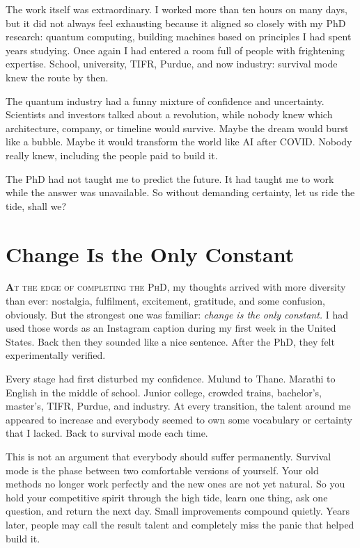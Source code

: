 \documentclass[11pt,twoside,openany]{book}
\newcommand{\dropcap}[2]{\lettrine[lines=3,findent=2pt,nindent=4pt]{\color{accent}\textsf{\textbf{#1}}}{#2}}
\newcommand{\scene}{\par\vspace{0.7em}{\centering\color{accent}\rule{0.85cm}{0.6pt}\par}\vspace{0.5em}\noindent\ignorespaces}
\begin{document}
\scene

The work itself was extraordinary. I worked more than ten hours on many days,
but it did not always feel exhausting because it aligned so closely with my
PhD research: quantum computing, building machines based on principles I had
spent years studying. Once again I had entered a room full of people with
frightening expertise. School, university, TIFR, Purdue, and now industry:
survival mode knew the route by then.

The quantum industry had a funny mixture of confidence and uncertainty.
Scientists and investors talked about a revolution, while nobody knew which
architecture, company, or timeline would survive. Maybe the dream would burst
like a bubble. Maybe it would transform the world like AI after COVID. Nobody
really knew, including the people paid to build it.

The PhD had not taught me to predict the future. It had taught me to work
while the answer was unavailable. So without demanding certainty, let us ride
the tide, shall we?

\chapter{Change Is the Only Constant}

\dropcap{A}{t the edge of completing the PhD,} my thoughts arrived with more
diversity than ever: nostalgia, fulfilment, excitement, gratitude, and some
confusion, obviously. But the strongest one was familiar: \textit{change is
the only constant.} I had used those words as an Instagram caption during my
first week in the United States. Back then they sounded like a nice sentence.
After the PhD, they felt experimentally verified.

Every stage had first disturbed my confidence. Mulund to Thane. Marathi to
English in the middle of school. Junior college, crowded trains, bachelor's,
master's, TIFR, Purdue, and industry. At every transition, the talent around
me appeared to increase and everybody seemed to own some vocabulary or
certainty that I lacked. Back to survival mode each time.

This is not an argument that everybody should suffer permanently. Survival
mode is the phase between two comfortable versions of yourself. Your old
methods no longer work perfectly and the new ones are not yet natural. So you
hold your competitive spirit through the high tide, learn one thing, ask one
question, and return the next day. Small improvements compound quietly. Years
later, people may call the result talent and completely miss the panic that
helped build it.
\end{document}
